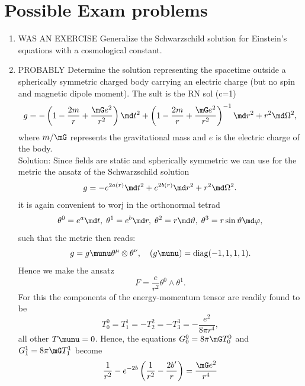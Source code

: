\chapter{Possible Exam problems}
\begin{enumerate}
	\item WAS AN EXERCISE Generalize the Schwarzschild solution for Einstein's equations with a cosmological constant.
	\item PROBABLY Determine the solution representing the spacetime outside a spherically symmetric charged body carrying an electric charge (but no spin and magnetic dipole moment). The sult is the RN sol (c=1) 
	\begin{equation}
		g = - \left(1-\frac{2m}{r} + \frac{\mG e^2}{r^2}\right) \md t^2 + \left(1 - \frac{2m}{r } + \frac{\mG e^2}{r^2}\right)^{-1} \md r^2 + r^2\md \Omega^2,
	\end{equation}
	where $m/\mG$ represents the gravitational mass and $e$ is the electric charge of the body.\\
	Solution: Since fields are static and spherically symmetric we can use for the metric the ansatz of the Schwarzschild solution 
	\begin{equation}
		g=-e^{2 a(r)} \md t^2 + e^{2 b(r)} \md r^2 + r^2\md \Omega^2.
	\end{equation}
	it is again convenient to worj in the orthonormal tetrad 
	\begin{equation}
	\theta^0 = e^a \md t,\; \theta^1= e^b \md r, \; \theta^2 = r \md \vartheta, \; \theta^3 = r\sin\vartheta \md \varphi,
	\end{equation}
	such that the metric then reads:
	\begin{equation}
		g=g\munu \theta^\mu \otimes \theta^\nu, \quad (g\munu) = \mathrm{diag}(-1,1,1,1).
	\end{equation}
	Hence we make the ansatz
	\begin{equation}
		F = \frac{e}{r^2} \theta^0 \wedge \theta^1.
	\end{equation}
	For this the components of the energy-momentum tensor are readily found to be
	\begin{equation}
		T^0_0=T^1_1=-T^2_2=-T^3_3 = -\frac{e^2}{8 \pi r^4},
	\end{equation}
	all other $T\munu =0$. Hence, the equations $G^0_0=8 \pi \mG T^0_0$ and $G^1_1= 8 \pi \mG T^1_1$ become
	\begin{align}
		\frac{1}{r^2} - e^{-2b} \left(\frac{1}{r^2} - \frac{2 b^\prime}{r}\right) &= \frac{\mG e^2}{r^4} \\

\end{align}
\end{enumerate}
